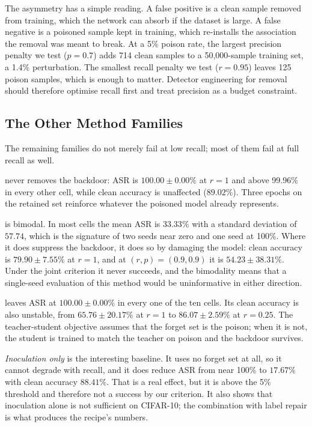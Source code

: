 The asymmetry has a simple reading. A false positive is a clean sample removed
from training, which the network can absorb if the dataset is large. A false
negative is a poisoned sample kept in training, which re-installs the association
the removal was meant to break. At a 5\% poison rate, the largest precision
penalty we test ($p{=}0.7$) adds 714 clean samples to a 50{,}000-sample training
set, a 1.4\% perturbation. The smallest recall penalty we test ($r{=}0.95$)
leaves 125 poison samples, which is enough to matter. Detector engineering for
removal should therefore optimise recall first and treat precision as a budget
constraint.

\subsection{The Other Method Families}
The remaining families do not merely fail at low recall; most of them fail at
full recall as well.

 never removes the backdoor: ASR is $100.00\pm0.00\%$ at
$r{=}1$ and above 99.96\% in every other cell, while clean accuracy is
unaffected ($89.02\%$). Three epochs on the retained set reinforce whatever the
poisoned model already represents.

 is bimodal. In most cells the mean ASR is $33.33\%$ with a
standard deviation of $57.74$, which is the signature of two seeds near zero and
one seed at 100\%. Where it does suppress the backdoor, it does so by damaging the
model: clean accuracy is $79.90\pm7.55\%$ at $r{=}1$, and at $(r,p)=(0.9,0.9)$ it
is $54.23\pm38.31\%$. Under the joint criterion it never succeeds, and the
bimodality means that a single-seed evaluation of this method would be
uninformative in either direction.

 leaves ASR at $100.00\pm0.00\%$ in every one of the ten cells.
Its clean accuracy is also unstable, from $65.76\pm20.17\%$ at $r{=}1$ to
$86.07\pm2.59\%$ at $r{=}0.25$. The teacher-student objective assumes that the
forget set is the poison; when it is not, the student is trained to match the
teacher on poison and the backdoor survives.

\emph{Inoculation only} is the interesting baseline. It uses no forget set at
all, so it cannot degrade with recall, and it does reduce ASR from near 100\% to
$17.67\%$ with clean accuracy $88.41\%$. That is a real effect, but it is above
the 5\% threshold and therefore not a success by our criterion. It also shows
that inoculation alone is not sufficient on CIFAR-10; the combination with label
repair is what produces the recipe's numbers.


